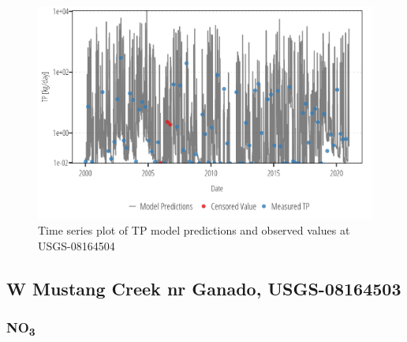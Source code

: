 \documentclass[
]{article}
\begin{document}
\begin{figure}[h]

{\centering \includegraphics{model_assessment_files/figure-pdf/unnamed-chunk-49-1.png}

}

\caption{Time series plot of TP model predictions and observed values at
USGS-08164504}

\end{figure}

\clearpage

\hypertarget{w-mustang-creek-nr-ganado-usgs-08164503}{%
\subsection{W Mustang Creek nr Ganado,
USGS-08164503}\label{w-mustang-creek-nr-ganado-usgs-08164503}}

\hypertarget{no3-3}{%
\subsubsection{\texorpdfstring{NO\textsubscript{3}}{NO3}}\label{no3-3}}
\end{document}
